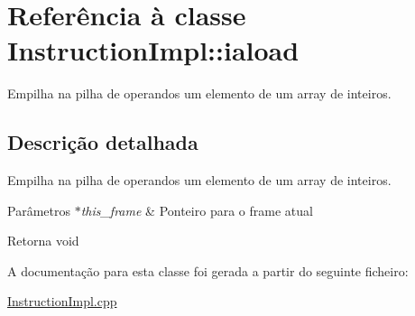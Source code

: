 \hypertarget{class_instruction_impl_1_1iaload}{}\section{Referência à classe Instruction\+Impl\+:\+:iaload}
\label{class_instruction_impl_1_1iaload}


Empilha na pilha de operandos um elemento de um array de inteiros.  




\subsection{Descrição detalhada}
Empilha na pilha de operandos um elemento de um array de inteiros. 


\begin{DoxyParams}{Parâmetros}
{\em $\ast$this\+\_\+frame} & Ponteiro para o frame atual \\
\hline
\end{DoxyParams}
\begin{DoxyReturn}{Retorna}
void 
\end{DoxyReturn}


A documentação para esta classe foi gerada a partir do seguinte ficheiro\+:\begin{DoxyCompactItemize}
\item 
\hyperlink{_instruction_impl_8cpp}{Instruction\+Impl.\+cpp}\end{DoxyCompactItemize}
